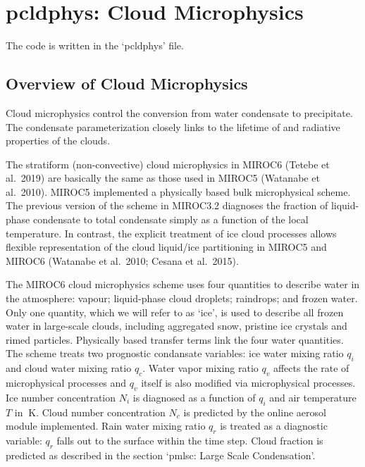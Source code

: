 \hypertarget{pcldphys-cloud-microphysics}{%
\section{pcldphys: Cloud
Microphysics}\label{pcldphys-cloud-microphysics}}

The code is written in the `pcldphys' file.

\hypertarget{overview-of-cloud-microphysics}{%
\subsection{Overview of Cloud
Microphysics}\label{overview-of-cloud-microphysics}}

Cloud microphysics control the conversion from water condensate to
precipitate. The condensate parameterization closely links to the
lifetime of and radiative properties of the clouds.

The stratiform (non-convective) cloud microphysics in MIROC6 (Tetebe et
al.~2019) are basically the same as those used in MIROC5 (Watanabe et
al.~2010). MIROC5 implemented a physically based bulk microphysical
scheme. The previous version of the scheme in MIROC3.2 diagnoses the
fraction of liquid-phase condensate to total condensate simply as a
function of the local temperature. In contrast, the explicit treatment
of ice cloud processes allows flexible representation of the cloud
liquid/ice partitioning in MIROC5 and MIROC6 (Watanabe et al.~2010;
Cesana et al.~2015).

The MIROC6 cloud microphysics scheme uses four quantities to describe
water in the atmosphere: vapour; liquid-phase cloud droplets; raindrops;
and frozen water. Only one quantity, which we will refer to as `ice', is
used to describe all frozen water in large-scale clouds, including
aggregated snow, pristine ice crystals and rimed particles. Physically
based transfer terms link the four water quantities. The scheme treats
two prognostic condansate variables: ice water mixing ratio \(q_i\) and
cloud water mixing ratio \(q_c\). Water vapor mixing ratio \(q_v\)
affects the rate of microphysical processes and \(q_v\) itself is also
modified via microphysical processes. Ice number concentration \(N_i\)
is diagnosed as a function of \(q_i\) and air temperature \(T\) in
\(\mathrm{~K}\). Cloud number concentration \(N_c\) is predicted by the
online aerosol module implemented. Rain water mixing ratio \(q_r\) is
treated as a diagnostic variable: \(q_r\) falls out to the surface
within the time step. Cloud fraction is predicted as described in the
section `pmlsc: Large Scale Condensation'.

